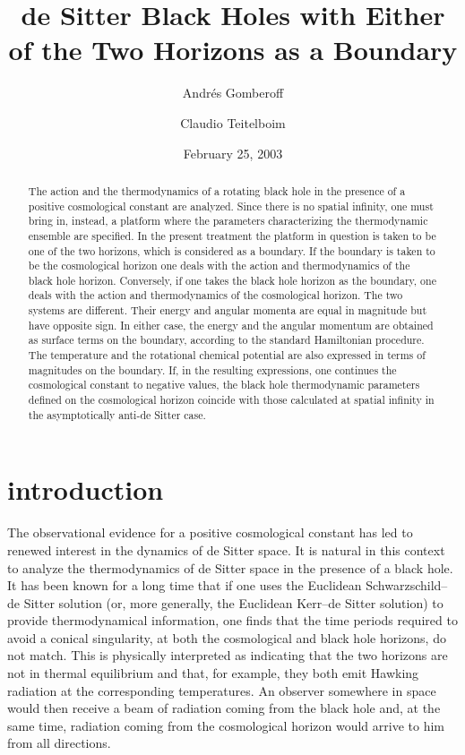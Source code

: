 \documentclass[a4paper,preprintnumbers,amsmath,amssymb]{revtex4}
\begin{document}
\preprint{}
\title{de Sitter Black Holes with Either of the Two Horizons as a Boundary}
\author{Andr\'es Gomberoff}
\author{Claudio Teitelboim}

\date{February 25, 2003}

\begin{abstract}
The action and the thermodynamics of a rotating black hole
in the presence of a positive cosmological constant are analyzed.
Since there is no spatial infinity, one must bring in, instead, a platform where
the parameters characterizing the thermodynamic ensemble
are specified. In the present treatment the platform in question is taken to be
one of the two horizons, which is considered as a boundary.
If the boundary is taken to be the cosmological horizon one deals with
the action and thermodynamics of the black hole horizon.
Conversely, if one takes the black hole horizon as the boundary, one deals with
the action and thermodynamics of the cosmological horizon. The two systems are different.
 Their energy and angular momenta are equal in magnitude but have opposite sign.
In either case, the energy and the angular momentum are obtained as surface terms
on the boundary, according to the standard Hamiltonian procedure. The temperature
and the rotational chemical potential are also expressed in terms of magnitudes on the boundary.
If, in the resulting expressions, one continues the cosmological constant to negative values, the black hole
thermodynamic parameters defined on the cosmological horizon coincide with those calculated at spatial infinity in the
asymptotically anti-de Sitter case.

\end{abstract}

\maketitle

\section{introduction}


The observational evidence for a positive cosmological constant has led to
renewed interest in the dynamics of de Sitter space\cite{Witten}. It is natural in this
context to analyze the thermodynamics of de Sitter space in the presence of
a black hole. It has been known for a long time  that
if one  uses the Euclidean Schwarzschild--de Sitter solution (or, more generally,
the Euclidean Kerr--de Sitter solution) to
provide thermodynamical information, one finds that the time periods
required to avoid a conical singularity, at both  the cosmological and black
hole horizons, do not match. This is physically interpreted as indicating
that the two horizons are not in thermal equilibrium and that, for example,
they both emit Hawking radiation at the corresponding temperatures.
An observer somewhere in space would then
receive a beam of radiation coming from the black hole and,
at the same time,  radiation coming from the
cosmological horizon would arrive to him from all directions\cite{GH}.
\end{document}

